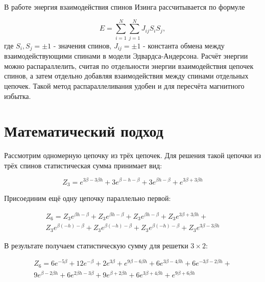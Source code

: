 \documentclass[10pt]{article}
\begin{document}
	В работе энергия взаимодействия спинов Изинга рассчитывается по формуле
	
	\begin{equation}
		E = \sum\limits_{i=1}^N \sum\limits_{j=1}^N J_{ij} S_i S_j,
	\end{equation}
	где $S_i, S_j = \pm 1$ - значения спинов, $J_{ij} = \pm 1$ - константа обмена между взаимодействующими спинами в модели Эдвардса-Андерсона. Расчёт энергии можно распараллелить, считая по отдельности энергии взаимодействия цепочек спинов, а затем отдельно добавляя взаимодействия между спинами отдельных цепочек. Такой метод распараллеливания удобен и для пересчёта магнитного избытка. 
	
	\section{Математический подход}
	
	Рассмотрим одномерную цепочку из трёх цепочек. Для решения такой цепочки из трёх спинов статистическая сумма принимает вид:
	
	\begin{equation}
		Z_3 = e^{3\beta - 3\beta h} + 3e^{\beta - h - \beta} + 3e^{\beta h - \beta} + e^{3\beta + 3\beta h}
		\label{eq:stat_3}
	\end{equation}
	
	Присоединим ещё одну цепочку параллельно первой:
	
	\begin{equation}
		\label{eq:stat_3_un}
		\begin{alignedat}{2}
			Z_6 = Z_3 e^{\beta  h-\beta }+Z_3 e^{\beta  h-\beta }+Z_3 e^{\beta  h-\beta }+Z_3 e^{3 \beta +3 \beta  h}+ \\
			Z_3 e^{\beta  (-h)-\beta }+Z_3 e^{\beta  (-h)-\beta }+Z_3 e^{\beta  (-h)-\beta }+Z_3 e^{3 \beta -3 \beta  h}
		\end{alignedat}
	\end{equation}
	
	В результате получаем статистическую сумму для решетки $3 \times 2$:
	
	\begin{equation}
		\label{eq:stat_3_res}
		\begin{alignedat}{2}
			Z_6 = 6 e^{-5 \beta }+12 e^{-\beta }+2 e^{3 \beta }+e^{9 \beta -6 \beta  h}+6 e^{3 \beta -4 \beta  h}+6 e^{-3 \beta -2 \beta  h}+\\
			9 e^{\beta -2 \beta  h}+6 e^{2 \beta  h-3 \beta }+9 e^{\beta +2 \beta  h}+6 e^{3 \beta +4 \beta  h}+e^{9 \beta +6 \beta  h}
		\end{alignedat}
	\end{equation}
	
\end{document}
